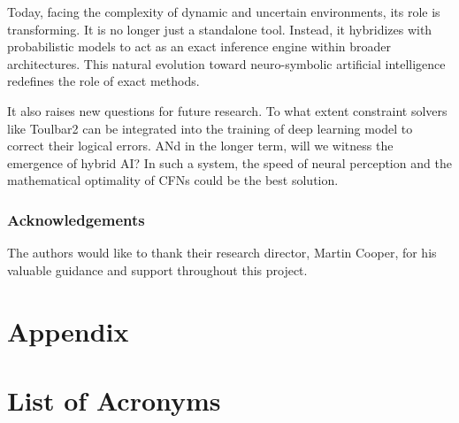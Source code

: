 \documentclass[runningheads]{llncs}
\begin{document}
Today, facing the complexity of dynamic and uncertain environments, its role is transforming. It is no longer just a standalone tool. Instead, it hybridizes with probabilistic models to act as an exact inference engine within broader architectures. This natural evolution toward neuro-symbolic artificial intelligence redefines the role of exact methods.

It also raises new questions for future research. 
To what extent constraint solvers like Toulbar2 can be integrated 
into the training of deep learning model to correct their logical errors.
ANd in the longer term, will we witness the emergence of hybrid AI? 
In such a system, the speed of neural perception 
and the mathematical optimality of \ac{CFNs} could be the best solution.

\subsubsection*{Acknowledgements}
The authors would like to thank their research director, Martin Cooper, for his valuable guidance and support throughout this project.

\newpage
\section{Appendix}
\appendix

\section{List of Acronyms}

\begin{acronym}[MINLP]

    

    

\end{acronym}


\clearpage

\nocite{*}

\end{document}
